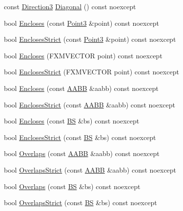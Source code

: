 \begin{DoxyCompactItemize}
\item 
const \hyperlink{structmage_1_1_direction3}{Direction3} \hyperlink{structmage_1_1_a_a_b_b_a9b9611522d1f5dd03e3c1787f8706b3d}{Diagonal} () const noexcept
\item 
bool \hyperlink{structmage_1_1_a_a_b_b_a308fce591178a9aeaed3838dfa32972f}{Encloses} (const \hyperlink{structmage_1_1_point3}{Point3} \&point) const noexcept
\item 
bool \hyperlink{structmage_1_1_a_a_b_b_a0399860c66da2dfc593b6ad5702c7525}{Encloses\+Strict} (const \hyperlink{structmage_1_1_point3}{Point3} \&point) const noexcept
\item 
bool \hyperlink{structmage_1_1_a_a_b_b_a7ad6bd87a94fca3995c3eb876f52404c}{Encloses} (F\+X\+M\+V\+E\+C\+T\+OR point) const noexcept
\item 
bool \hyperlink{structmage_1_1_a_a_b_b_a65616922dfc15d46c611764c12d50ec1}{Encloses\+Strict} (F\+X\+M\+V\+E\+C\+T\+OR point) const noexcept
\item 
bool \hyperlink{structmage_1_1_a_a_b_b_a06f017756a593461127613e4d77d0944}{Encloses} (const \hyperlink{structmage_1_1_a_a_b_b}{A\+A\+BB} \&aabb) const noexcept
\item 
bool \hyperlink{structmage_1_1_a_a_b_b_af037df0800e1e8c3564363f154c2424a}{Encloses\+Strict} (const \hyperlink{structmage_1_1_a_a_b_b}{A\+A\+BB} \&aabb) const noexcept
\item 
bool \hyperlink{structmage_1_1_a_a_b_b_ab906cfa784000d7fd49e9a405825e72f}{Encloses} (const \hyperlink{structmage_1_1_b_s}{BS} \&bs) const noexcept
\item 
bool \hyperlink{structmage_1_1_a_a_b_b_af7c0070023a2b7d3b724cd4077782fb0}{Encloses\+Strict} (const \hyperlink{structmage_1_1_b_s}{BS} \&bs) const noexcept
\item 
bool \hyperlink{structmage_1_1_a_a_b_b_a0953268725119ef25651ab50ad3de658}{Overlaps} (const \hyperlink{structmage_1_1_a_a_b_b}{A\+A\+BB} \&aabb) const noexcept
\item 
bool \hyperlink{structmage_1_1_a_a_b_b_a00628d5ed2bf73021bbb3cdf94049580}{Overlaps\+Strict} (const \hyperlink{structmage_1_1_a_a_b_b}{A\+A\+BB} \&aabb) const noexcept
\item 
bool \hyperlink{structmage_1_1_a_a_b_b_ac105ff686890e3fbb36bb230c663bde9}{Overlaps} (const \hyperlink{structmage_1_1_b_s}{BS} \&bs) const noexcept
\item 
bool \hyperlink{structmage_1_1_a_a_b_b_ac2f7270ec51acb91aed4965f135a53a9}{Overlaps\+Strict} (const \hyperlink{structmage_1_1_b_s}{BS} \&bs) const noexcept

\end{DoxyCompactItemize}
